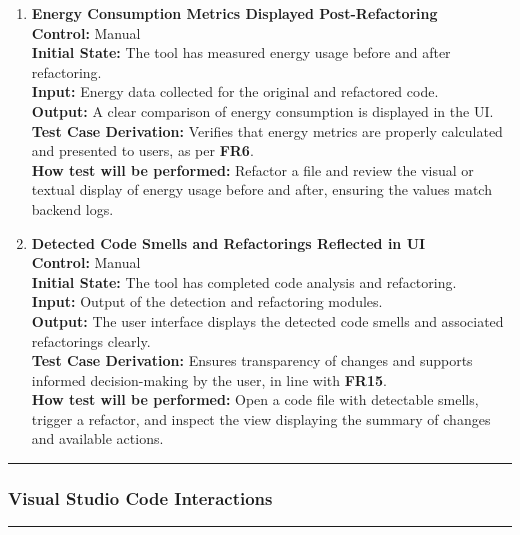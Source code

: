 \documentclass[12pt, titlepage]{article}
\newcommand{\colorrule}{\textcolor{BlueViolet}{\rule{\linewidth}{2pt}}}
\begin{document}
\begin{enumerate}[label={\bf
    \textcolor{Maroon}{test-FR-RP-\arabic*}}, wide=0pt, font=\itshape]

  \item \textbf{Energy Consumption Metrics Displayed Post-Refactoring} \\[2mm]
    \textbf{Control:} Manual \\
    \textbf{Initial State:} The tool has measured energy usage before and after refactoring. \\
    \textbf{Input:} Energy data collected for the original and refactored code. \\
    \textbf{Output:} A clear comparison of energy consumption is displayed in the UI. \\[2mm]
    \textbf{Test Case Derivation:} Verifies that energy metrics are properly calculated and presented to users, as per \textbf{FR6}. \\[2mm]
    \textbf{How test will be performed:} Refactor a file and review the visual or textual display of energy usage before and after, ensuring the values match backend logs.

  \item \textbf{Detected Code Smells and Refactorings Reflected in UI} \\[2mm]
    \textbf{Control:} Manual \\
    \textbf{Initial State:} The tool has completed code analysis and refactoring. \\
    \textbf{Input:} Output of the detection and refactoring modules. \\
    \textbf{Output:} The user interface displays the detected code smells and associated refactorings clearly. \\[2mm]
    \textbf{Test Case Derivation:} Ensures transparency of changes and supports informed decision-making by the user, in line with \textbf{FR15}. \\[2mm]
    \textbf{How test will be performed:} Open a code file with detectable smells, trigger a refactor, and inspect the view displaying the summary of changes and available actions.

\end{enumerate}

\noindent\colorrule

\subsubsection{Visual Studio Code Interactions}
\colorrule
\end{document}
